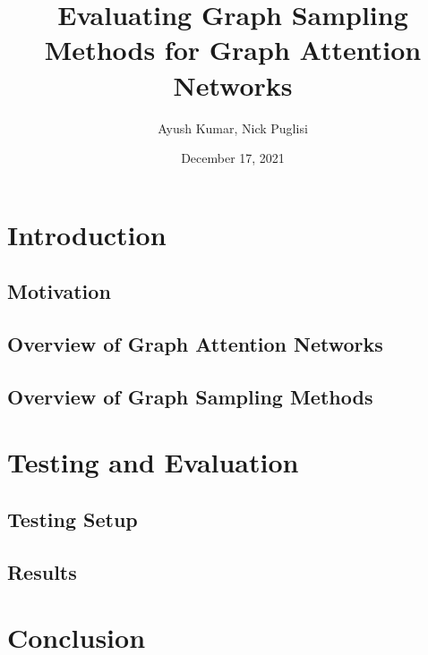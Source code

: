 \documentclass{article}
\title{Evaluating Graph Sampling Methods for Graph Attention Networks}
\author{Ayush Kumar, Nick Puglisi}
\date{December 17, 2021}
\begin{document}
	\maketitle
	\tableofcontents
	\section{Introduction}
	\subsection{Motivation}
	\subsection{Overview of Graph Attention Networks}
	\subsection{Overview of Graph Sampling Methods} 
	
	\section{Testing and Evaluation}
	\subsection{Testing Setup}
	\subsection{Results}
	
	\section{Conclusion}
	
	
\end{document}
